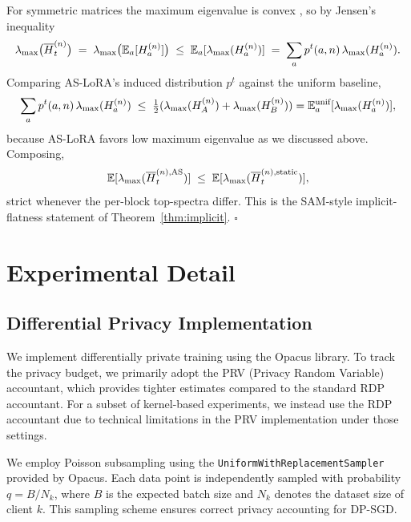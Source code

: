 For symmetric matrices the maximum eigenvalue is convex \cite{horn2012matrix}, so by Jensen's inequality
\begin{equation}
\lambda_{\max}\bigl(\overline H_t^{(n)}\bigr) \;=\; \lambda_{\max}\bigl(\mathbb{E}_a[H_a^{(n)}]\bigr) \;\le\; \mathbb{E}_a[\lambda_{\max}(H_a^{(n)})] \;=\; \sum_a p^t(a,n)\,\lambda_{\max}(H_a^{(n)}).
\end{equation}
Comparing AS-LoRA's induced distribution $p^t$ against the uniform baseline,
\begin{equation}
\sum_a p^t(a,n)\,\lambda_{\max}(H_a^{(n)}) \;\le\; \tfrac{1}{2}(\lambda_{\max}(H_A^{(n)})+\lambda_{\max}(H_B^{(n)})) = \mathbb{E}_a^\text{unif}[\lambda_{\max}(H_a^{(n)})],
\end{equation}
because AS-LoRA favors low maximum eigenvalue as we discussed above. Composing,
\begin{equation}
\mathbb{E}[\lambda_{\max}(\overline H_t^{(n),\text{AS}})] \;\le\; \mathbb{E}[\lambda_{\max}(\overline H_t^{(n),\text{static}})],
\end{equation}
strict whenever the per-block top-spectra differ. This is the SAM-style implicit-flatness statement of Theorem~\ref{thm:implicit}. \hfill$\square$














\section{Experimental Detail} \label{app:experimental_detail}

\subsection{Differential Privacy Implementation}

We implement differentially private training using the Opacus library. 
To track the privacy budget, we primarily adopt the PRV (Privacy Random Variable) accountant, which provides tighter estimates compared to the standard RDP accountant. 
For a subset of kernel-based experiments, we instead use the RDP accountant due to technical limitations in the PRV implementation under those settings.

We employ Poisson subsampling using the \texttt{UniformWithReplacementSampler} provided by Opacus. 
Each data point is independently sampled with probability $q = B / N_k$, where $B$ is the expected batch size and $N_k$ denotes the dataset size of client $k$. 
This sampling scheme ensures correct privacy accounting for DP-SGD.



